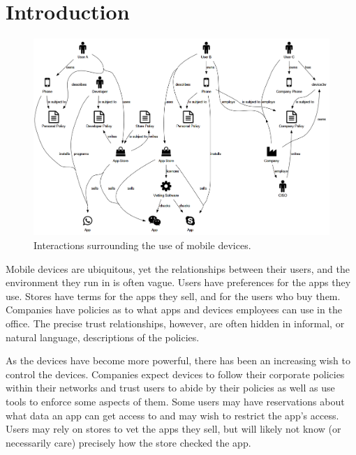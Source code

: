 \documentclass[thesis.tex]{subfiles}
\begin{document}
\chapter{Introduction}

%

\begin{figure}
  \centering
  \includegraphics[width=\linewidth]{figures/mobile-ecosystem.png}
  \caption{Interactions surrounding the use of mobile devices.}
  \label{fig:mobile-ecosystem}
\end{figure}

Mobile devices are ubiquitous, yet the relationships between their users, and
the environment they run in is often vague. Users have preferences for the apps
they use. Stores have terms for the apps they sell, and for the users who buy
them. Companies have policies as to what apps and devices employees can use in
the office. The precise trust relationships, however, are often hidden in
informal, or natural language, descriptions of the policies.

As the devices have become more powerful, there has been an increasing wish to
control the devices. Companies expect devices to follow their corporate policies
within their networks and trust users to abide by their policies as well as use
tools to enforce some aspects of them. Some users may have reservations about
what data an app can get access to and may wish to restrict the app's access.
Users may rely on stores to vet the apps they sell, but will likely not know (or
necessarily care) precisely how the store checked the app.
\end{document}
